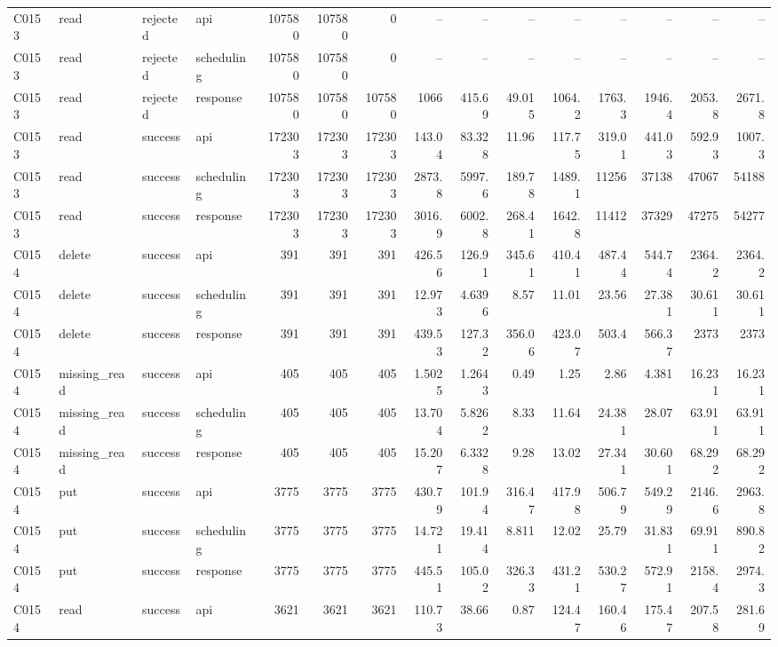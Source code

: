 \begin{landscape}
\begin{longtable}{llllrrrrrrrrrrr}
C0153 & read & rejected & api & 107580 & 107580 & 0 & -- & -- & -- & -- & -- & -- & -- & --\\
C0153 & read & rejected & scheduling & 107580 & 107580 & 0 & -- & -- & -- & -- & -- & -- & -- & --\\
C0153 & read & rejected & response & 107580 & 107580 & 107580 & 1066 & 415.69 & 49.015 & 1064.2 & 1763.3 & 1946.4 & 2053.8 & 2671.8\\
C0153 & read & success & api & 172303 & 172303 & 172303 & 143.04 & 83.328 & 11.96 & 117.75 & 319.01 & 441.03 & 592.93 & 1007.3\\
C0153 & read & success & scheduling & 172303 & 172303 & 172303 & 2873.8 & 5997.6 & 189.78 & 1489.1 & 11256 & 37138 & 47067 & 54188\\
C0153 & read & success & response & 172303 & 172303 & 172303 & 3016.9 & 6002.8 & 268.41 & 1642.8 & 11412 & 37329 & 47275 & 54277\\
C0154 & delete & success & api & 391 & 391 & 391 & 426.56 & 126.91 & 345.61 & 410.41 & 487.44 & 544.74 & 2364.2 & 2364.2\\
C0154 & delete & success & scheduling & 391 & 391 & 391 & 12.973 & 4.6396 & 8.57 & 11.01 & 23.56 & 27.381 & 30.611 & 30.611\\
C0154 & delete & success & response & 391 & 391 & 391 & 439.53 & 127.32 & 356.06 & 423.07 & 503.4 & 566.37 & 2373 & 2373\\
C0154 & missing\_\allowbreak{}read & success & api & 405 & 405 & 405 & 1.5025 & 1.2643 & 0.49 & 1.25 & 2.86 & 4.381 & 16.231 & 16.231\\
C0154 & missing\_\allowbreak{}read & success & scheduling & 405 & 405 & 405 & 13.704 & 5.8262 & 8.33 & 11.64 & 24.381 & 28.07 & 63.911 & 63.911\\
C0154 & missing\_\allowbreak{}read & success & response & 405 & 405 & 405 & 15.207 & 6.3328 & 9.28 & 13.02 & 27.341 & 30.601 & 68.292 & 68.292\\
C0154 & put & success & api & 3775 & 3775 & 3775 & 430.79 & 101.94 & 316.47 & 417.98 & 506.79 & 549.29 & 2146.6 & 2963.8\\
C0154 & put & success & scheduling & 3775 & 3775 & 3775 & 14.721 & 19.414 & 8.811 & 12.02 & 25.79 & 31.831 & 69.911 & 890.82\\
C0154 & put & success & response & 3775 & 3775 & 3775 & 445.51 & 105.02 & 326.33 & 431.21 & 530.27 & 572.91 & 2158.4 & 2974.3\\
C0154 & read & success & api & 3621 & 3621 & 3621 & 110.73 & 38.66 & 0.87 & 124.47 & 160.46 & 175.47 & 207.58 & 281.69\\

\end{longtable}
\end{landscape}
